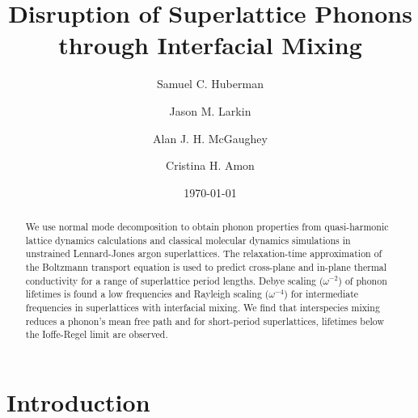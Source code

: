 \documentclass[aps,prb,preprint,preprintnumbers,amsmath,amssymb,floatfix,superscriptaddress]{revtex4}
\begin{document}
\title{Disruption of Superlattice Phonons through Interfacial Mixing}
\author{Samuel C. Huberman}
\author{Jason M. Larkin}
\author{Alan J. H. McGaughey}
\author{Cristina H. Amon}

\date{\today}%
\vspace{14mm}
  
\begin{abstract}

We use normal mode decomposition to obtain phonon properties from quasi-harmonic lattice dynamics calculations and classical molecular dynamics simulations in unstrained Lennard-Jones argon superlattices. The relaxation-time approximation of the Boltzmann transport equation is used to predict cross-plane and in-plane thermal conductivity for a range of superlattice period lengths. Debye scaling ($\omega^{-2}$) of phonon lifetimes is found a low frequencies and Rayleigh scaling ($\omega^{-4}$) for intermediate frequencies in superlattices with interfacial mixing. We find that interspecies mixing reduces a phonon's mean free path and for short-period superlattices, lifetimes below the Ioffe-Regel limit are observed.

\end{abstract}
\maketitle
\section{Introduction}
\end{document}
